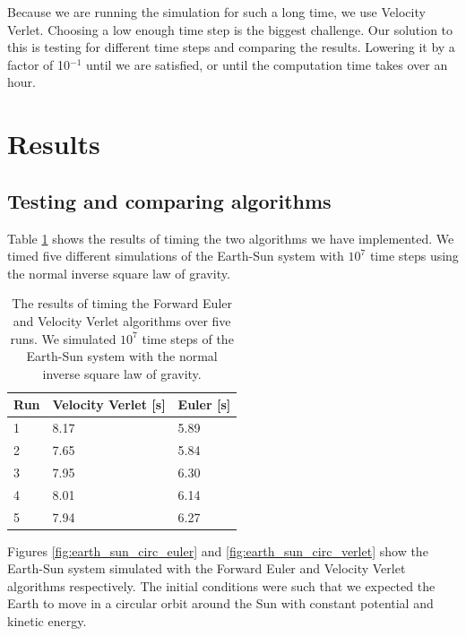 \documentclass[reprint, english,notitlepage,nofootinbib]{revtex4-1}  %
\begin{document}
Because we are running the simulation for such a long time, we use Velocity Verlet. Choosing a low enough time step is the biggest challenge. Our solution to this is testing for different time steps and comparing the results. Lowering it by a factor of 10$^{-1}$ until we are satisfied, or until the computation time takes over an hour.



\section{Results}

\subsection{Testing and comparing algorithms}

Table \ref{tab:timing} shows the results of timing the two algorithms we have implemented. We timed five different simulations of the Earth-Sun system with $10^7$ time steps using the normal inverse square law of gravity.

\begin{table}[]
\begin{tabular}{|l|l|l|}
  \hline
Run & Velocity Verlet {[}s{]} & Euler {[}s{]} \\
\hline
1   & 8.17                    & 5.89          \\
2   & 7.65                    & 5.84          \\
3   & 7.95                    & 6.30          \\
4   & 8.01                    & 6.14          \\
5   & 7.94                    & 6.27          \\
\hline
\end{tabular}
\caption{The results of timing the Forward Euler and Velocity Verlet algorithms over five runs. We simulated $10^7$ time steps of the Earth-Sun system with the normal inverse square law of gravity.}
\label{tab:timing}
\end{table}

Figures \ref{fig:earth_sun_circ_euler} and \ref{fig:earth_sun_circ_verlet} show the Earth-Sun system simulated with the Forward Euler and Velocity Verlet algorithms respectively. The initial conditions were such that we expected the Earth to move in a circular orbit around the Sun with constant potential and kinetic energy.
\end{document}

